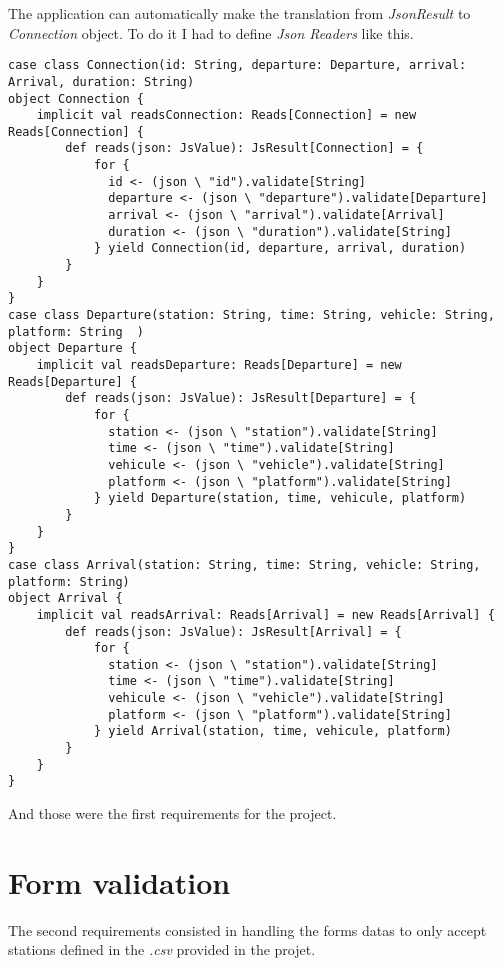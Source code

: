 \documentclass[a4paper,11pt]{article}
\begin{document}
The application can automatically make the translation from \emph{JsonResult}
to \emph{Connection} object. To do it I had to define \emph{Json Readers} like
this.

\begin{lstlisting}[style=scala]
case class Connection(id: String, departure: Departure, arrival: Arrival, duration: String)
object Connection {
    implicit val readsConnection: Reads[Connection] = new Reads[Connection] {
        def reads(json: JsValue): JsResult[Connection] = {
            for {
              id <- (json \ "id").validate[String]
              departure <- (json \ "departure").validate[Departure]
              arrival <- (json \ "arrival").validate[Arrival]
              duration <- (json \ "duration").validate[String]
            } yield Connection(id, departure, arrival, duration)
        }
    }
}
case class Departure(station: String, time: String, vehicle: String, platform: String  )
object Departure {
    implicit val readsDeparture: Reads[Departure] = new Reads[Departure] {
        def reads(json: JsValue): JsResult[Departure] = {
            for {
              station <- (json \ "station").validate[String]
              time <- (json \ "time").validate[String]
              vehicule <- (json \ "vehicle").validate[String]
              platform <- (json \ "platform").validate[String]
            } yield Departure(station, time, vehicule, platform)
        }
    }
}
case class Arrival(station: String, time: String, vehicle: String, platform: String)
object Arrival {
    implicit val readsArrival: Reads[Arrival] = new Reads[Arrival] {
        def reads(json: JsValue): JsResult[Arrival] = {
            for {
              station <- (json \ "station").validate[String]
              time <- (json \ "time").validate[String]
              vehicule <- (json \ "vehicle").validate[String]
              platform <- (json \ "platform").validate[String]
            } yield Arrival(station, time, vehicule, platform)
        }
    }
}
\end{lstlisting}

And those were the first requirements for the project.

\section{Form validation}

The second requirements consisted in handling the forms datas to only accept
stations defined in the \emph{.csv} provided in the projet.
\end{document}
